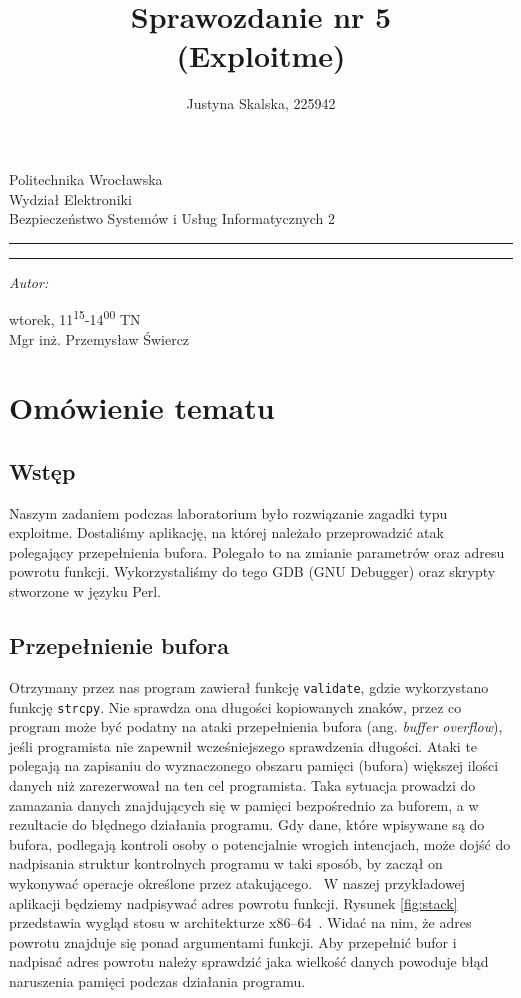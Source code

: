 \documentclass[12pt,a4paper,titlepage]{article}
\author{Justyna Skalska, 225942}
\title{Sprawozdanie nr 5\\
(Exploitme)}
\makeatletter
\newcommand{\linia}{\rule{\linewidth}{0.4mm}}
\renewcommand{\maketitle}{\begin{titlepage}
    \vspace*{1cm}
    \begin{center}\small
    Politechnika Wrocławska\\
    Wydział Elektroniki\\
    Bezpieczeństwo Systemów i Usług Informatycznych 2
    \end{center}
    \vspace{3cm}
    \noindent\linia
    \begin{center}
      \LARGE \textsc{\@title}
         \end{center}
     \linia
    \vspace{0.5cm}
    \begin{flushright}
    \begin{minipage}{7cm}
    \textit{\small Autor:}\\
    \normalsize \textsc{\@author} \par
    \end{minipage}
    \vspace{5cm}

     {\small wtorek, 11\textsuperscript{15}-14\textsuperscript{00} TN}\\
        Mgr inż. Przemysław Świercz
     \end{flushright}
    \vspace*{\stretch{6}}
    \begin{center}
    \@date
    \end{center}
  \end{titlepage}%
}
\makeatother
\begin{document}
\maketitle

\tableofcontents 
\newpage
\listoflistings
\newpage
\listoffigures
\newpage

\section{Omówienie tematu}
\subsection{Wstęp}
Naszym zadaniem podczas laboratorium było rozwiązanie zagadki typu exploitme. Dostaliśmy aplikację, na której należało przeprowadzić atak polegający przepełnienia bufora. Polegało to na zmianie parametrów oraz adresu powrotu funkcji. Wykorzystaliśmy do tego GDB (GNU Debugger) oraz skrypty stworzone w języku Perl.

\subsection{Przepełnienie bufora}
Otrzymany przez nas program zawierał funkcję \texttt{validate}, gdzie wykorzystano funkcję \texttt{strcpy}. Nie sprawdza ona długości kopiowanych znaków, przez co program może być podatny na ataki przepełnienia bufora (ang. \textit{buffer overflow}), jeśli programista nie zapewnił wcześniejszego sprawdzenia długości. Ataki te polegają na zapisaniu do wyznaczonego obszaru pamięci (bufora) większej ilości danych niż zarezerwował na ten cel programista. Taka sytuacja prowadzi do zamazania danych znajdujących się w pamięci bezpośrednio za buforem, a w rezultacie do błędnego działania programu. Gdy dane, które wpisywane są do bufora, podlegają kontroli osoby o potencjalnie wrogich intencjach, może dojść do nadpisania struktur kontrolnych programu w taki sposób, by zaczął on wykonywać operacje określone przez atakującego.~\cite{buffer-overflow}
\newline\newline
W naszej przykładowej aplikacji będziemy nadpisywać adres powrotu funkcji. Rysunek \ref{fig:stack} przedstawia wygląd stosu w architekturze x86–64~\cite{stack}. Widać na nim, że adres powrotu znajduje się ponad argumentami funkcji. Aby przepełnić bufor i nadpisać adres powrotu należy sprawdzić jaka wielkość danych powoduje błąd naruszenia pamięci podczas działania programu.
\end{document}

